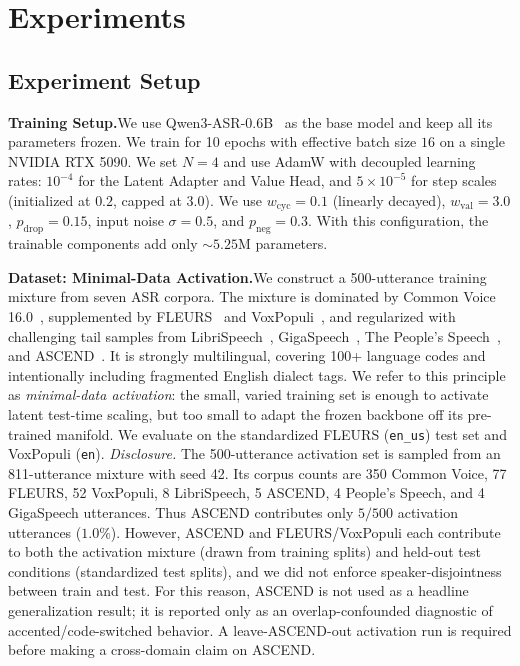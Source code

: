 \documentclass[a4paper]{article}
\begin{document}
\section{Experiments}
\subsection{Experiment Setup}
\label{sec:exp_setup}

\textbf{Training Setup.}\quad We use Qwen3-ASR-0.6B~\cite{yang2024qwen2audio} as the base model and keep all its parameters frozen. We train for 10 epochs with effective batch size $16$ on a single NVIDIA RTX 5090. We set $N{=}4$ and use AdamW with decoupled learning rates: $10^{-4}$ for the Latent Adapter and Value Head, and $5 \times 10^{-5}$ for step scales (initialized at $0.2$, capped at $3.0$). We use $w_{\text{cyc}}{=}0.1$ (linearly decayed), $w_{\text{val}}{=}3.0$, $p_{\text{drop}}{=}0.15$, input noise $\sigma{=}0.5$, and $p_{\text{neg}}{=}0.3$. With this configuration, the trainable components add only $\sim 5.25\text{M}$ parameters.

\textbf{Dataset: Minimal-Data Activation.}\quad We construct a 500-utterance training mixture from seven ASR corpora. The mixture is dominated by Common Voice 16.0~\cite{commonvoice:2020}, supplemented by FLEURS~\cite{fleurs2022arxiv} and VoxPopuli~\cite{wang-etal-2021-voxpopuli}, and regularized with challenging tail samples from LibriSpeech~\cite{panayotov2015librispeech}, GigaSpeech~\cite{GigaSpeech2021}, The People's Speech~\cite{DBLP:journals/corr/abs-2111-09344}, and ASCEND~\cite{lovenia2022ascend}. It is strongly multilingual, covering 100+ language codes and intentionally including fragmented English dialect tags. We refer to this principle as \emph{minimal-data activation}: the small, varied training set is enough to activate latent test-time scaling, but too small to adapt the frozen backbone off its pre-trained manifold. We evaluate on the standardized FLEURS (\texttt{en\_us}) test set and VoxPopuli (\texttt{en}). \emph{Disclosure.} The 500-utterance activation set is sampled from an 811-utterance mixture with seed 42. Its corpus counts are 350 Common Voice, 77 FLEURS, 52 VoxPopuli, 8 LibriSpeech, 5 ASCEND, 4 People's Speech, and 4 GigaSpeech utterances. Thus ASCEND contributes only $5/500$ activation utterances ($1.0\%$). However, ASCEND and FLEURS/VoxPopuli each contribute to both the activation mixture (drawn from training splits) and held-out test conditions (standardized test splits), and we did not enforce speaker-disjointness between train and test. For this reason, ASCEND is not used as a headline generalization result; it is reported only as an overlap-confounded diagnostic of accented/code-switched behavior. A leave-ASCEND-out activation run is required before making a cross-domain claim on ASCEND.
\end{document}
